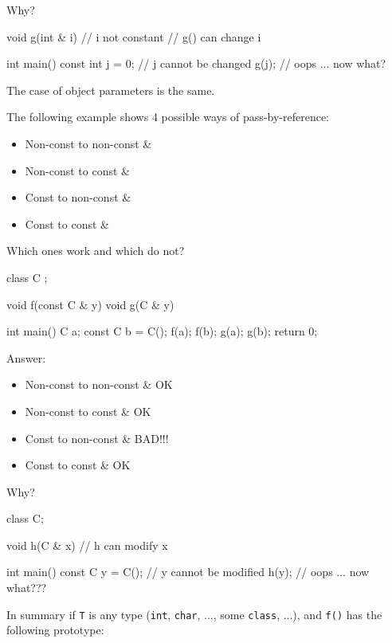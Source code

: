 Why?

\begin{consolethree}[escapeinside=||]
void g(int & i) {} // i not constant
                   // g() can change i

int main()
{
    const int j = 0; // j cannot be changed
    g(j); // oops ... now what?
}
\end{consolethree}

The case of object parameters is the same.

The following example shows 4 possible ways of pass-by-reference:

\begin{itemize}
\item Non-const to non-const \&
\item Non-const to const \&
\item Const to non-const \&
\item Const to const \&
\end{itemize}

Which ones work and which do not?

\begin{consolethree}[escapeinside=||]
class C {};

void f(const C & y) {}
void g(C & y) {}

int main()
{
    C a;
    const C b = C();
    f(a);
    f(b);
    g(a);
    g(b);
    return 0;
}
\end{consolethree}

Answer:

\begin{itemize}
\item Non-const to non-const \&     OK
\item Non-const to const \&         OK
\item Const to non-const \&         BAD!!!
\item Const to const \&             OK
\end{itemize}

Why?

\begin{consolethree}[escapeinside=||]
class C{};

void h(C & x) {} // h can modify x

int main()
{
    const C y = C(); // y cannot be modified
    h(y); // oops ... now what???
}
\end{consolethree}

In summary if \texttt{T} is any type (\texttt{int}, \texttt{char}, ...,
some \texttt{class}, ...), and \texttt{f()} has the following prototype:

